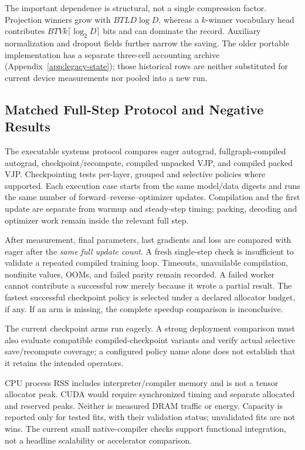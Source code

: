 \documentclass{article}
\theoremstyle{plain}
\theoremstyle{definition}
\theoremstyle{remark}
\begin{document}
The important dependence is structural, not a single compression factor.
Projection winners grow with $BTLD\log D$, whereas a $k$-winner vocabulary
head contributes $BTVk\lceil\log_2D\rceil$ bits and can dominate the record.
Auxiliary normalization and dropout fields further narrow the saving.
The older portable implementation has a separate three-cell accounting
archive (Appendix~\ref{app:legacy-state}); those historical rows are neither
substituted for current device measurements nor pooled into a new run.

\subsection{Matched Full-Step Protocol and Negative Results}

The executable systems protocol compares eager autograd, fullgraph-compiled
autograd, checkpoint/recompute, compiled unpacked VJP, and compiled packed
VJP. Checkpointing tests per-layer, grouped and selective policies where
supported. Each execution case starts from the same model/data digests and
runs the same number of forward--reverse--optimizer updates. Compilation
and the first update are separate from warmup and steady-step timing;
packing, decoding and optimizer work remain inside the relevant full step.

After measurement, final parameters, last gradients and loss are compared
with eager after the \emph{same full update count}. A fresh single-step
check is insufficient to validate a repeated compiled training loop.
Timeouts, unavailable compilation, nonfinite values, OOMs, and failed parity
remain recorded. A failed worker cannot contribute a successful row merely
because it wrote a partial result. The fastest successful checkpoint policy
is selected under a declared allocator budget, if any. If an arm is missing,
the complete speedup comparison is inconclusive.

The current checkpoint arms run eagerly. A strong deployment comparison must
also evaluate compatible compiled-checkpoint variants and verify actual
selective save/recompute coverage; a configured policy name alone does not
establish that it retains the intended operators.

CPU process RSS includes interpreter/compiler memory and is not a tensor
allocator peak. CUDA would require synchronized timing and separate allocated
and reserved peaks. Neither is measured DRAM traffic or energy. Capacity is
reported only for tested fits, with their validation status; unvalidated fits
are not wins. The current small native-compiler checks support functional
integration, not a headline scalability or accelerator comparison.
\end{document}
